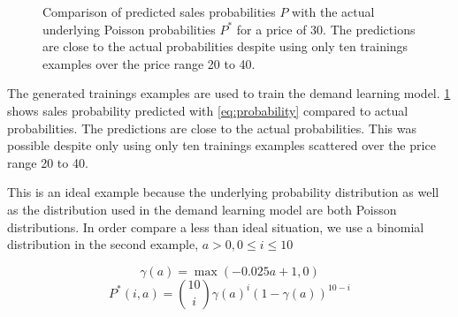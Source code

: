 \begin{figure}[t]
	\caption[Comparison of predicted probabilites with underlying Poisson probabilities]{Comparison of predicted sales probabilities $P$ with the actual underlying Poisson probabilities $P^*$ for a price of 30. The predictions are close to the actual probabilities despite using only ten trainings examples over the price range 20 to 40.}
	\label{fig:probs_poisson}
\end{figure}

The generated trainings examples are used to train the demand learning model.
\cref{fig:probs_poisson} shows sales probability predicted with \cref{eq:probability} compared to actual probabilities.
The predictions are close to the actual probabilities.
This was possible despite only using only ten trainings examples scattered over the price range 20 to 40.

This is an ideal example because the underlying probability distribution as well as the distribution used in the demand learning model are both Poisson distributions.
In order compare a less than ideal situation, we use a binomial distribution in the second example, $a > 0, 0 \leq i \leq 10$

$$
\gamma(a) = \max(-0.025 a + 1, 0)
$$
$$
P^*(i, a) = {10\choose i} \gamma(a)^i (1 - \gamma(a))^{10-i}
$$

